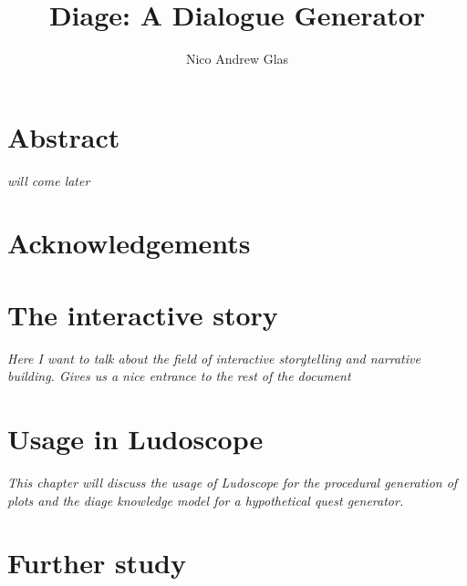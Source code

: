 \documentclass[12pt,a4paper,onecolumn,titlepage]{book}
\author{Nico Andrew Glas}
\title{Diage: A Dialogue Generator}
\begin{document}
\maketitle
\chapter*{Abstract}
\textit{will come later}\cite{Cavazza:2002:CIS:630325.630747} \cite{Greimas:Boydstun:90} \cite{Magerko:2004:ACD:1597321.1597339} \cite{Porteous:2009:CNG:1695522.1695557} \cite{Weyhrauch:1997:GID:925491} \cite{Riedl03character-focusednarrative} \cite{Riedl:2003:MIU:860575.860694} \cite{Riedl:2004:IPM:1018409.1018753} \cite{Sgouros199929}

\chapter*{Acknowledgements}
\tableofcontents

\chapter{The interactive story}
\textit{Here I want to talk about the field of interactive storytelling and narrative building. Gives us a nice entrance to the rest of the document}


\chapter{Usage in Ludoscope}
\label{sec:ludoscope}
\textit{This chapter will discuss the usage of Ludoscope for the procedural generation of plots and the diage knowledge model for a hypothetical quest generator.}
\chapter{Further study}
\label{sec:further_study}


\end{document}
